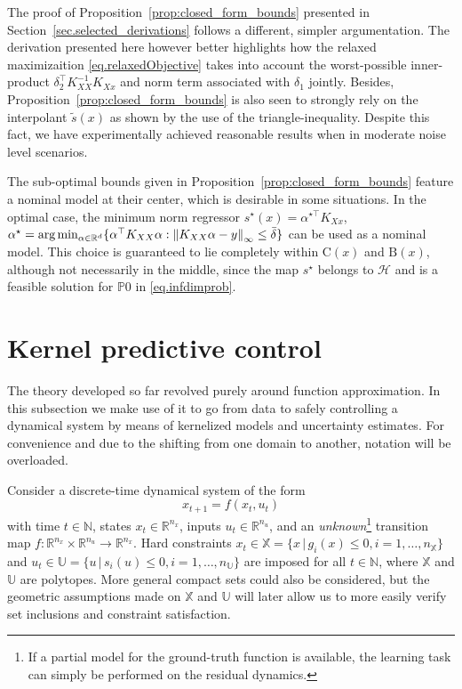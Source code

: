 The proof of Proposition~\ref{prop:closed_form_bounds} presented in Section~\ref{sec.selected_derivations} follows a different, simpler argumentation. The derivation presented here however better highlights how the relaxed maximizaition \eqref{eq.relaxedObjective} takes into account the worst-possible inner-product $\delta_2^\top K_{XX}^{-1}K_{Xx}$ and norm term associated with $\delta_1$ jointly. Besides, Proposition~\ref{prop:closed_form_bounds} is also seen to strongly rely on the interpolant $\tilde s(x)$ as shown by the use of the triangle-inequality.  Despite this fact, we have experimentally achieved reasonable results when in moderate noise level scenarios.

\begin{remark}
	The sub-optimal bounds given in Proposition~\ref{prop:closed_form_bounds} feature a nominal model at their center, which is desirable in some situations. In the optimal case, the minimum norm regressor $s^\star(x) = \alpha^{\star\top} K_{Xx}$, $\alpha^\star = \text{arg}\min_{\alpha \in \mathbb{R}^d} \{ \alpha^\top K_{XX} \alpha : \left\| K_{XX} \alpha - y \right\|_\infty \leq \bar\delta \}$ can be used as a nominal model. This choice is guaranteed to lie completely within $\text{C}(x)$ and $\text{B}(x)$, although not necessarily in the middle, since the map $s^\star$ belongs to $\mathcal{H}$ and is a feasible solution for $\mathds{P}0$ in \eqref{eq.infdimprob}.
\end{remark}

\section{Kernel predictive control}
\label{sec.kpc}

The theory developed so far revolved purely around function approximation. In this subsection we make use of it to go from data to safely controlling a dynamical system by means of kernelized models and uncertainty estimates. For convenience and due to the shifting from one domain to another, notation will be overloaded.

Consider a discrete-time dynamical system of the form 
\begin{equation}
	\label{eq.dyn_sys}
	x_{t+1} = f(x_t,u_t)	
\end{equation}
with time $t \in \mathbb{N}$, states $x_t \in \mathbb{R}^{n_x}$, inputs $u_t \in \mathbb{R}^{n_u}$, and an \textit{unknown}\footnote{If a partial model for the ground-truth function is available, the learning task can simply be performed on the residual dynamics.} transition map $f: \mathbb{R}^{n_x} \times \mathbb{R}^{n_u} \rightarrow \mathbb{R}^{n_x}$. Hard constraints $x_t \in \mathbb{X} = \{x \, | \, g_i(x) \leq 0, i=1,\dots,n_{\mathbb{X}}\}$ and $u_t \in \mathbb{U} = \{u \, | \, s_i(u) \leq 0, i=1,\dots,n_{\mathbb{U}}\}$ are imposed for all $t \in \mathbb{N}$, where $\mathbb{X}$ and $\mathbb{U}$ are polytopes. More general compact sets could also be considered, but the geometric assumptions made on $\mathbb{X}$ and $\mathbb{U}$ will later allow us to more easily verify set inclusions and constraint satisfaction.

